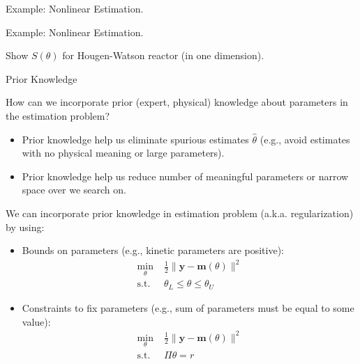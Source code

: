 \documentclass[9pt]{beamer}
\begin{document}
%
\begin{frame}{Example: Nonlinear Estimation.}

\begin{block}{}
\end{block}

\end{frame}

%
\begin{frame}{Example: Nonlinear Estimation.}

\begin{block}{}
Show $S(\theta)$ for Hougen-Watson reactor (in one dimension). 
\end{block}

\end{frame}


%
\begin{frame}{Prior Knowledge}

\begin{block}{}
How can we incorporate prior (expert, physical) knowledge about parameters in the estimation problem? 
\end{block}
\begin{itemize}
\item Prior knowledge help us eliminate spurious estimates $\hat{\theta}$ (e.g., avoid estimates with no physical meaning or large parameters). 
\item Prior knowledge help us reduce number of meaningful parameters or narrow space over we search on.
\end{itemize}
We can incorporate prior knowledge in estimation problem (a.k.a. regularization) by using: 
\begin{itemize}
\item Bounds on parameters (e.g., kinetic parameters are positive):
\begin{align*}
\min_{\theta}& \; \frac{1}{2}\|\mathbf{y}- \mathbf{m}(\theta)\|^2\\ 
\textrm{s.t.}&\; \theta_L\leq \theta\leq\theta_U 
\end{align*}
\item Constraints to fix parameters (e.g., sum of parameters must be equal to some value):
\begin{align*}
\min_{\theta}& \; \frac{1}{2}\|\mathbf{y}- \mathbf{m}(\theta)\|^2\\ 
\textrm{s.t.}&\; \Pi \theta = r
\end{align*}

\end{itemize}
\end{frame}
\end{document}
